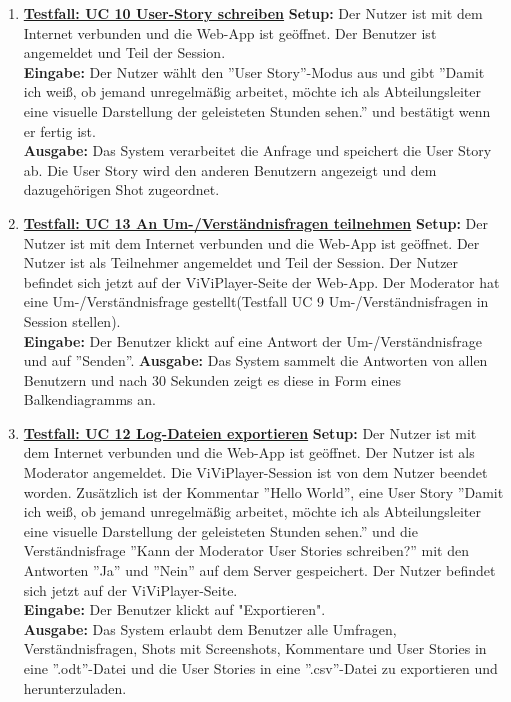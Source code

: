 \begin{enumerate}
	\item \underline{\textbf{Testfall: UC 10 User-Story schreiben}} \linebreak
	\textbf{Setup:} Der Nutzer ist mit dem Internet verbunden und die Web-App ist geöffnet. Der Benutzer ist angemeldet und Teil der Session.\\
	\textbf{Eingabe:} Der Nutzer wählt den ''User Story''-Modus aus und gibt ''Damit ich weiß, ob jemand unregelmäßig arbeitet, möchte ich als Abteilungsleiter eine visuelle Darstellung der geleisteten Stunden sehen.'' und bestätigt wenn er fertig ist.\\
	\textbf{Ausgabe:} Das System verarbeitet die Anfrage und speichert die User Story ab. Die User Story wird den anderen Benutzern angezeigt und dem dazugehörigen Shot zugeordnet. \\
	
	\item \underline{\textbf{Testfall: UC 13 An Um-/Verständnisfragen teilnehmen}} \linebreak
	\textbf{Setup:} Der Nutzer ist mit dem Internet verbunden und die Web-App ist geöffnet. Der Nutzer ist als Teilnehmer angemeldet und Teil der Session. Der Nutzer befindet sich jetzt auf der ViViPlayer-Seite der Web-App. Der Moderator hat eine Um-/Verständnisfrage gestellt(Testfall UC 9 Um-/Verständnisfragen in Session stellen).\\
	\textbf{Eingabe:} Der Benutzer klickt auf eine Antwort der Um-/Verständnisfrage und auf ''Senden''.
	\textbf{Ausgabe:} Das System sammelt die Antworten von allen Benutzern und nach 30 Sekunden zeigt es diese in Form eines Balkendiagramms an.
	
	\item \underline{\textbf{Testfall: UC 12 Log-Dateien exportieren}} \linebreak
	\textbf{Setup:} Der Nutzer ist mit dem Internet verbunden und die Web-App ist geöffnet. Der Nutzer ist als Moderator angemeldet. Die ViViPlayer-Session ist von dem Nutzer beendet worden. Zusätzlich ist der Kommentar ''Hello World'', eine User Story ''Damit ich weiß, ob jemand unregelmäßig arbeitet, möchte ich als Abteilungsleiter eine visuelle Darstellung der geleisteten Stunden sehen.'' und die Verständnisfrage ''Kann der Moderator User Stories schreiben?'' mit den Antworten ''Ja'' und ''Nein'' auf dem Server gespeichert. Der Nutzer befindet sich jetzt auf der ViViPlayer-Seite. \\
	\textbf{Eingabe:} Der Benutzer klickt auf "Exportieren". \\
	\textbf{Ausgabe:} Das System erlaubt dem Benutzer alle Umfragen, Verständnisfragen, Shots mit Screenshots, Kommentare und User Stories in eine ''.odt''-Datei und die User Stories in eine ''.csv''-Datei zu exportieren und herunterzuladen.\\ 
	
\end{enumerate}
